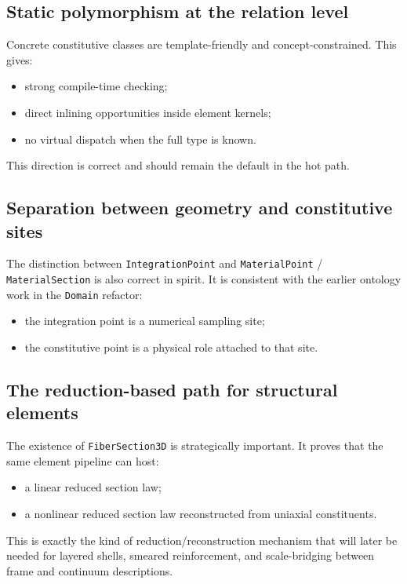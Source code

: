 \subsection{Static polymorphism at the relation level}

Concrete constitutive classes are template-friendly and concept-constrained.
This gives:
\begin{itemize}
  \item strong compile-time checking;
  \item direct inlining opportunities inside element kernels;
  \item no virtual dispatch when the full type is known.
\end{itemize}

This direction is correct and should remain the default in the hot path.

\subsection{Separation between geometry and constitutive sites}

The distinction between \texttt{IntegrationPoint} and
\texttt{MaterialPoint} / \texttt{MaterialSection} is also correct in spirit.
It is consistent with the earlier ontology work in the \texttt{Domain}
refactor:
\begin{itemize}
  \item the integration point is a numerical sampling site;
  \item the constitutive point is a physical role attached to that site.
\end{itemize}

\subsection{The reduction-based path for structural elements}

The existence of \texttt{FiberSection3D} is strategically important.  It proves
that the same element pipeline can host:
\begin{itemize}
  \item a linear reduced section law;
  \item a nonlinear reduced section law reconstructed from uniaxial
        constituents.
\end{itemize}

This is exactly the kind of reduction/reconstruction mechanism that will later
be needed for layered shells, smeared reinforcement, and scale-bridging
between frame and continuum descriptions.

